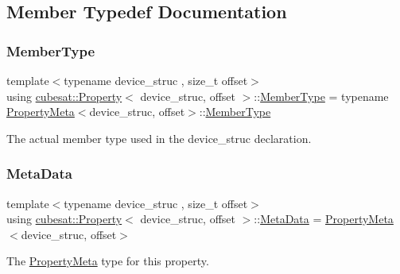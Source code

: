 \subsection{Member Typedef Documentation}
\mbox{\label{structcubesat_1_1Property_a01cc6c681c8f3dcb97f16d186a04ca73}} 
\subsubsection{\texorpdfstring{Member\+Type}{MemberType}}
{\footnotesize\ttfamily template$<$typename device\+\_\+struc , size\+\_\+t offset$>$ \\
using \hyperlink{structcubesat_1_1Property}{cubesat\+::\+Property}$<$ device\+\_\+struc, offset $>$\+::\hyperlink{structcubesat_1_1Property_a01cc6c681c8f3dcb97f16d186a04ca73}{Member\+Type} =  typename \hyperlink{structcubesat_1_1PropertyMeta}{Property\+Meta}$<$device\+\_\+struc, offset$>$\+::\hyperlink{structcubesat_1_1Property_a01cc6c681c8f3dcb97f16d186a04ca73}{Member\+Type}}



The actual member type used in the device\+\_\+struc declaration. 

\mbox{\label{structcubesat_1_1Property_abde80e33ecde1656ac9035d4b52477ce}} 
\subsubsection{\texorpdfstring{Meta\+Data}{MetaData}}
{\footnotesize\ttfamily template$<$typename device\+\_\+struc , size\+\_\+t offset$>$ \\
using \hyperlink{structcubesat_1_1Property}{cubesat\+::\+Property}$<$ device\+\_\+struc, offset $>$\+::\hyperlink{structcubesat_1_1Property_abde80e33ecde1656ac9035d4b52477ce}{Meta\+Data} =  \hyperlink{structcubesat_1_1PropertyMeta}{Property\+Meta}$<$device\+\_\+struc, offset$>$}



The \hyperlink{structcubesat_1_1PropertyMeta}{Property\+Meta} type for this property. 

\mbox{\label{structcubesat_1_1Property_a24aaec6241faac15f50c63bb6c972fd4}} 
